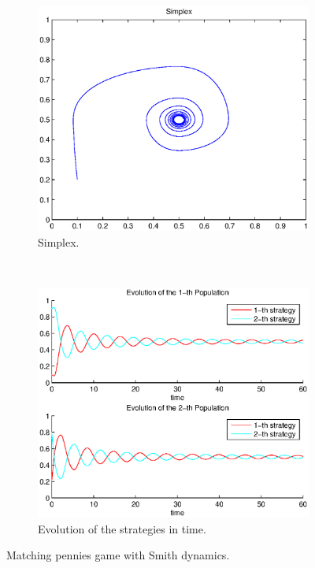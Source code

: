 \documentclass[a4paper,10pt]{article}
\begin{document}
\begin{figure}
  \centering
  \begin{subfigure}[b]{0.45\textwidth}
	  \includegraphics[width=\textwidth]{./images/test2_simplex_smith.eps}
	  \caption{Simplex.}
	  \label{fig:test2_simplex_smith}
  \end{subfigure}
  ~ 
  \begin{subfigure}[b]{0.45\textwidth}
	  \includegraphics[width=\textwidth]{./images/test2_ev_smith.eps}
	  \caption{Evolution of the strategies in time.}
	  \label{fig:test2_ev_smith}
  \end{subfigure}
  \caption{Matching pennies game with Smith dynamics.}
  \label{fig:mp_game_smith}
\end{figure}
\end{document}
